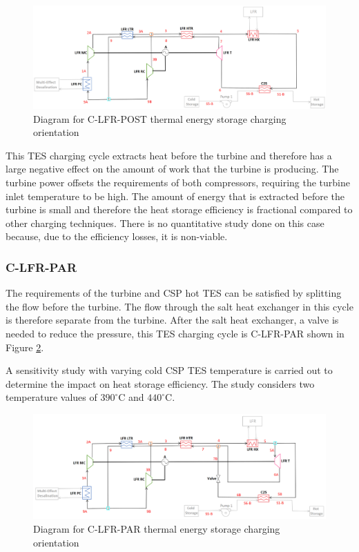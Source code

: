 \begin{figure}[H]
    \widefigure
    \includegraphics[width=\linewidth]{Definitions/c-lfr-post.pdf}
    \caption{Diagram for C-LFR-POST thermal energy storage charging orientation\label{c-lfr-post}}
\end{figure}
\begin{paracol}{2}
\linenumbers
\switchcolumn

This TES charging cycle extracts heat before the turbine and therefore has a large negative effect on the amount of work that the turbine is producing. The turbine power offsets the requirements of both compressors, requiring the turbine inlet temperature to be high. The amount of energy that is extracted before the turbine is small and therefore the heat storage efficiency is fractional compared to other charging techniques. There is no quantitative study done on this case because, due to the efficiency losses, it is non-viable. 

\subsubsection{C-LFR-PAR} 

The requirements of the turbine and CSP hot TES can be satisfied by splitting the flow before the turbine. The flow through the salt heat exchanger in this cycle is therefore separate from the turbine. After the salt heat exchanger, a valve is needed to reduce the pressure, this TES charging cycle is C-LFR-PAR shown in Figure \ref{c-lfr-par}.

A sensitivity study with varying cold CSP TES temperature is carried out to determine the impact on heat storage efficiency. The study considers two temperature values of $390^{\circ}$C and $440^{\circ}$C.

\clearpage
\end{paracol}
\begin{figure}[H]
    \widefigure
    \includegraphics[width=\linewidth]{Definitions/c-lfr-par.pdf}
    \caption{Diagram for C-LFR-PAR thermal energy storage charging orientation\label{c-lfr-par}}
\end{figure}
